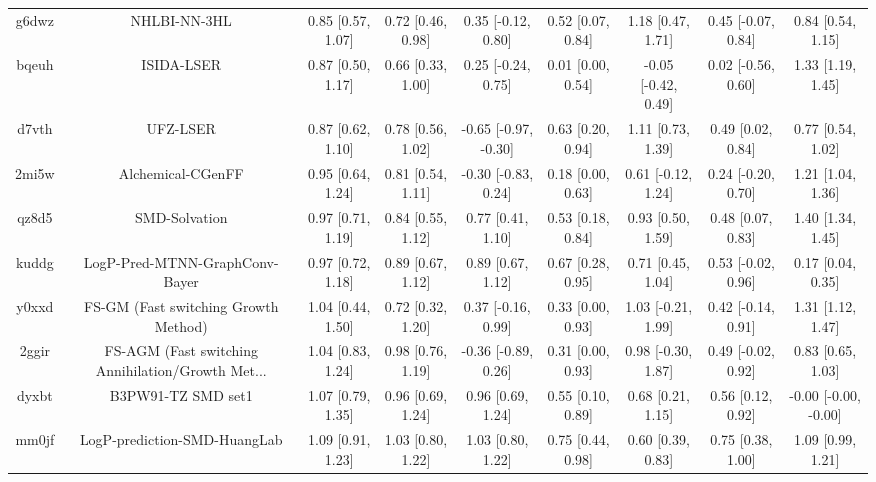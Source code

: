 \documentclass{article}
\begin{document}
\begin{center}
\begin{longtable}{|ccccccccc|}
 g6dwz &                                       NHLBI-NN-3HL &  0.85 [0.57, 1.07] &  0.72 [0.46, 0.98] &    0.35 [-0.12, 0.80] &  0.52 [0.07, 0.84] &    1.18 [0.47, 1.71] &   0.45 [-0.07, 0.84] &     0.84 [0.54, 1.15] \\
 bqeuh &                                         ISIDA-LSER &  0.87 [0.50, 1.17] &  0.66 [0.33, 1.00] &    0.25 [-0.24, 0.75] &  0.01 [0.00, 0.54] &  -0.05 [-0.42, 0.49] &   0.02 [-0.56, 0.60] &     1.33 [1.19, 1.45] \\
 d7vth &                                           UFZ-LSER &  0.87 [0.62, 1.10] &  0.78 [0.56, 1.02] &  -0.65 [-0.97, -0.30] &  0.63 [0.20, 0.94] &    1.11 [0.73, 1.39] &    0.49 [0.02, 0.84] &     0.77 [0.54, 1.02] \\
 2mi5w &                                  Alchemical-CGenFF &  0.95 [0.64, 1.24] &  0.81 [0.54, 1.11] &   -0.30 [-0.83, 0.24] &  0.18 [0.00, 0.63] &   0.61 [-0.12, 1.24] &   0.24 [-0.20, 0.70] &     1.21 [1.04, 1.36] \\
 qz8d5 &                                      SMD-Solvation &  0.97 [0.71, 1.19] &  0.84 [0.55, 1.12] &     0.77 [0.41, 1.10] &  0.53 [0.18, 0.84] &    0.93 [0.50, 1.59] &    0.48 [0.07, 0.83] &     1.40 [1.34, 1.45] \\
 kuddg &                     LogP-Pred-MTNN-GraphConv-Bayer &  0.97 [0.72, 1.18] &  0.89 [0.67, 1.12] &     0.89 [0.67, 1.12] &  0.67 [0.28, 0.95] &    0.71 [0.45, 1.04] &   0.53 [-0.02, 0.96] &     0.17 [0.04, 0.35] \\
 y0xxd &               FS-GM (Fast switching Growth Method) &  1.04 [0.44, 1.50] &  0.72 [0.32, 1.20] &    0.37 [-0.16, 0.99] &  0.33 [0.00, 0.93] &   1.03 [-0.21, 1.99] &   0.42 [-0.14, 0.91] &     1.31 [1.12, 1.47] \\
 2ggir &  FS-AGM (Fast switching Annihilation/Growth Met... &  1.04 [0.83, 1.24] &  0.98 [0.76, 1.19] &   -0.36 [-0.89, 0.26] &  0.31 [0.00, 0.93] &   0.98 [-0.30, 1.87] &   0.49 [-0.02, 0.92] &     0.83 [0.65, 1.03] \\
 dyxbt &                                 B3PW91-TZ SMD set1 &  1.07 [0.79, 1.35] &  0.96 [0.69, 1.24] &     0.96 [0.69, 1.24] &  0.55 [0.10, 0.89] &    0.68 [0.21, 1.15] &    0.56 [0.12, 0.92] &  -0.00 [-0.00, -0.00] \\
 mm0jf &                       LogP-prediction-SMD-HuangLab &  1.09 [0.91, 1.23] &  1.03 [0.80, 1.22] &     1.03 [0.80, 1.22] &  0.75 [0.44, 0.98] &    0.60 [0.39, 0.83] &    0.75 [0.38, 1.00] &     1.09 [0.99, 1.21] \\

\end{longtable}
\end{center}
\end{document}
